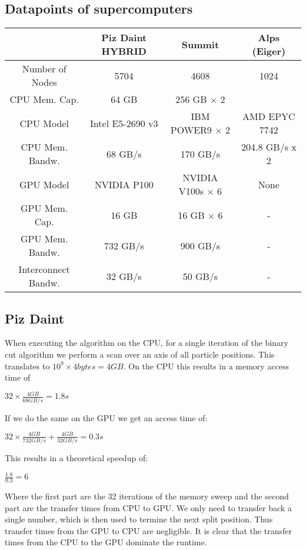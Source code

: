 \documentclass[]{article}
\begin{document}
\subsection{Datapoints of supercomputers}

\small
\begin{center}
	\begin{tabular}{ c c c c }
		& Piz Daint HYBRID \cite{piz_daint} & Summit & Alps (Eiger) \\ 
		\hline
		Number of Nodes & 5704 & 4608 & 1024\\
		CPU Mem. Cap. & 64 GB & 256 GB $\times$ 2  \\   
		CPU Model & Intel E5-2690 v3 & IBM POWER9 $\times$ 2 & AMD EPYC 7742 \\
		CPU Mem. Bandw.  & 68 GB/s & 170 GB/s & 204.8 GB/s x 2	\\
		GPU Model & NVIDIA P100 & NVIDIA V100s  $\times$ 6 & None \\
		GPU Mem. Cap. & 16 GB & 16 GB $\times$ 6 & -\\
		GPU Mem. Bandw. & 732 GB/s & 900 GB/s & -\\
		Interconnect Bandw. & 32 GB/s & 50 GB/s & -\\
	\end{tabular}
\end{center}
\normalfont
\subsection{Piz Daint} 
When executing the algorithm on the CPU, for a single iteration of the binary cut algorithm we perform a scan over an axis of all particle positions. This translates to $10^9 \times 4 bytes = 4 GB$.
On the CPU this results in a memory access time of 
\begin{center}
	$32 \times \frac{ 4 GB}{68 GB/s} = 1.8 s$ 
\end{center}

If we do the same on the GPU we get an access time of:
\begin{center}
	$32 \times \frac{4 GB}{732 GB/s} + \frac{4 GB}{32 GB/s} = 0.3 s$ 
\end{center}

This results in a theoretical speedup of:

\begin{center}
	$\frac{1.8}{0.3} = 6$
\end{center}

Where the first part are the 32 iterations of the memory sweep and the second part are the transfer times from CPU to GPU. We only need to transfer back a single number, which is then used to termine the next split position. Thus transfer times from the GPU to CPU are negligible. It is clear that the transfer times from the CPU to the GPU dominate the runtime.
\end{document}
